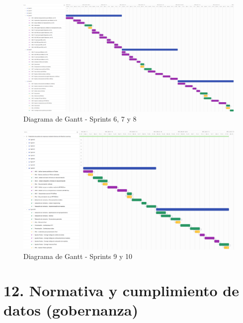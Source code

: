 \documentclass[
11pt, %
]{charter}
\begin{document}
\begin{landscape}
\begin{figure}[htpb]
\centering 
\includegraphics[width=1.5\textwidth]{./Figuras/Gantt-3.png}
\caption{Diagrama de Gantt - Sprints 6, 7 y 8}
\label{fig:gantt3}
\end{figure}
\end{landscape}

\begin{landscape}
\begin{figure}[htpb]
\centering 
\includegraphics[width=1.5\textwidth]{./Figuras/Gantt-4.png}
\caption{Diagrama de Gantt - Sprints 9 y 10}
\label{fig:gantt4}
\end{figure}
\end{landscape}

\section{12. Normativa y cumplimiento de datos (gobernanza)}

\end{document}
